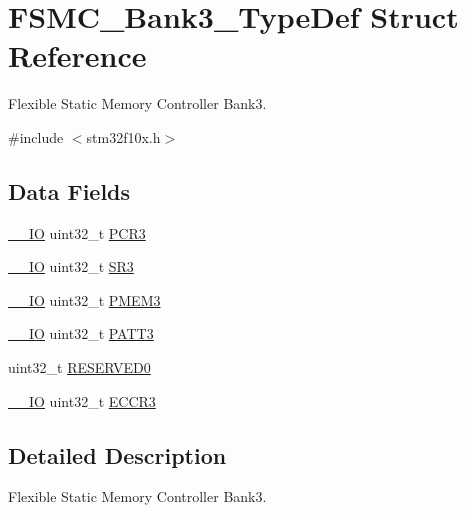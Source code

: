 \hypertarget{struct_f_s_m_c___bank3___type_def}{}\section{F\+S\+M\+C\+\_\+\+Bank3\+\_\+\+Type\+Def Struct Reference}
\label{struct_f_s_m_c___bank3___type_def}


Flexible Static Memory Controller Bank3.  




{\ttfamily \#include $<$stm32f10x.\+h$>$}

\subsection*{Data Fields}
\begin{DoxyCompactItemize}
\item 
\mbox{\hyperlink{core__sc300_8h_aec43007d9998a0a0e01faede4133d6be}{\+\_\+\+\_\+\+IO}} uint32\+\_\+t \mbox{\hyperlink{struct_f_s_m_c___bank3___type_def_a73861fa74b83973fa1b5f92735c042ef}{P\+C\+R3}}
\item 
\mbox{\hyperlink{core__sc300_8h_aec43007d9998a0a0e01faede4133d6be}{\+\_\+\+\_\+\+IO}} uint32\+\_\+t \mbox{\hyperlink{struct_f_s_m_c___bank3___type_def_af30c34f7c606cb9416a413ec5fa36491}{S\+R3}}
\item 
\mbox{\hyperlink{core__sc300_8h_aec43007d9998a0a0e01faede4133d6be}{\+\_\+\+\_\+\+IO}} uint32\+\_\+t \mbox{\hyperlink{struct_f_s_m_c___bank3___type_def_aba8981e4f06cfb3db7d9959242052f80}{P\+M\+E\+M3}}
\item 
\mbox{\hyperlink{core__sc300_8h_aec43007d9998a0a0e01faede4133d6be}{\+\_\+\+\_\+\+IO}} uint32\+\_\+t \mbox{\hyperlink{struct_f_s_m_c___bank3___type_def_aba03fea9c1bb2242d963e29f1b94d25e}{P\+A\+T\+T3}}
\item 
uint32\+\_\+t \mbox{\hyperlink{struct_f_s_m_c___bank3___type_def_af86c61a5d38a4fc9cef942a12744486b}{R\+E\+S\+E\+R\+V\+E\+D0}}
\item 
\mbox{\hyperlink{core__sc300_8h_aec43007d9998a0a0e01faede4133d6be}{\+\_\+\+\_\+\+IO}} uint32\+\_\+t \mbox{\hyperlink{struct_f_s_m_c___bank3___type_def_a6062be7dc144c07e01c303cb49d69ce2}{E\+C\+C\+R3}}
\end{DoxyCompactItemize}


\subsection{Detailed Description}
Flexible Static Memory Controller Bank3. 

